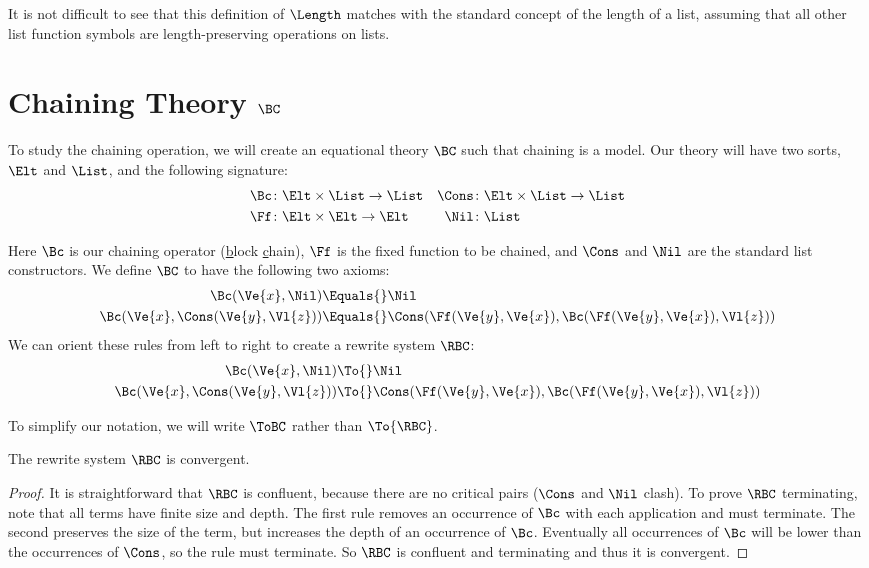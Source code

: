 It is not difficult to see that this definition of $\Length$ matches with the
standard concept of the length of a list, assuming that all other list function
symbols are length-preserving operations on lists.



\section{Chaining Theory $\BC$}\label{sec:bc-theory}
To study the chaining operation, we will create an equational theory $\BC$ such
that chaining is a model. Our theory will have two sorts, $\Elt$ and $\List$,
and the following signature:
\begin{align*}
    \Bc &\colon \Elt \times \List \to \List &
    \Cons &\colon \Elt \times \List \to \List \\
    \Ff &\colon \Elt \times \Elt \to \Elt &
    \Nil &\colon \List
\end{align*}

Here $\Bc$ is our chaining operator (\underline{b}lock \underline{c}hain),
$\Ff$ is the fixed function to be chained, and $\Cons$ and $\Nil$ are the
standard list constructors. We define $\BC$ to have the following two axioms:
\begin{align*}
    \Bc(\Ve{x}, \Nil) &\Equals{} \Nil \\
    \Bc(\Ve{x}, \Cons(\Ve{y}, \Vl{z}))
    &\Equals{} \Cons(\Ff(\Ve{y}, \Ve{x}), \Bc(\Ff(\Ve{y}, \Ve{x}), \Vl{z}))
\end{align*}
We can orient these rules from left to right to create a rewrite system $\RBC$:
\begin{align*}
    \Bc(\Ve{x}, \Nil) &\To{} \Nil \\
    \Bc(\Ve{x}, \Cons(\Ve{y}, \Vl{z}))
    &\To{} \Cons(\Ff(\Ve{y}, \Ve{x}), \Bc(\Ff(\Ve{y}, \Ve{x}), \Vl{z}))
\end{align*}

To simplify our notation, we will write $\ToBC$ rather than $\To{\RBC}$.

\begin{Lemma}
    The rewrite system $\RBC$ is convergent.
\end{Lemma}
\begin{proof}
    It is straightforward that $\RBC$ is confluent, because there are no
    critical pairs ($\Cons$ and $\Nil$ clash). To prove $\RBC$ terminating,
    note that all terms have finite size and depth. The first rule removes an
    occurrence of $\Bc$ with each application and must terminate. The second
    preserves the size of the term, but increases the depth of an occurrence of
    $\Bc$. Eventually all occurrences of $\Bc$ will be lower than the
    occurrences of $\Cons$, so the rule must terminate. So $\RBC$ is confluent
    and terminating and thus it is convergent.
\end{proof}

